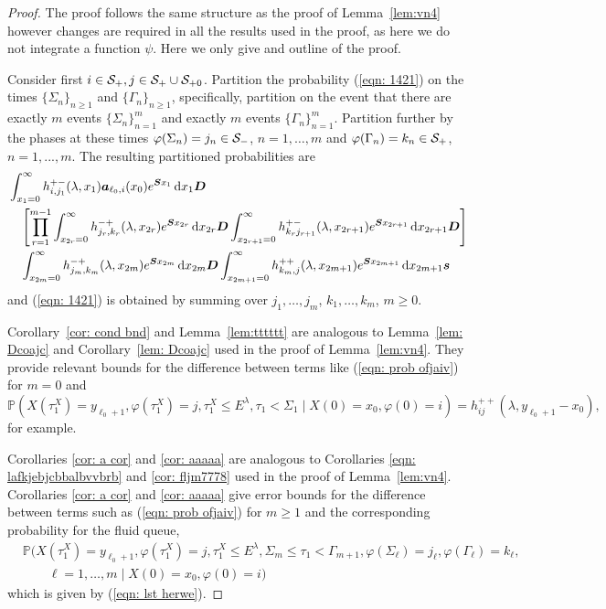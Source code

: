 \begin{proof}
	The proof follows the same structure as the proof of Lemma~\ref{lem:vn4} however changes are required in all the results used in the proof, as here we do not integrate a function \(\psi\). Here we only give and outline of the proof. 

	Consider first \(i\in \mathcal{S}_+,j\in\mathcal{S}_+\cup\mathcal{S}_{+0}\). Partition the probability (\ref{eqn: 1421}) on the times \(\{\Sigma_n\}_{n\geq 1}\) and \(\{\Gamma_n\}_{n\geq 1}\), specifically, partition on the event that there are exactly \(m\) events \(\{\Sigma_n\}_{n=1}^m\) and exactly \(m\) events \(\{\Gamma_n\}_{n=1}^m\). Partition further by the phases at these times \(\varphi(\Sigma_n)=j_n\in\mathcal{S}_-\), \(n=1,\dots,m\) and \(\varphi(\Gamma_n)=k_n\in\mathcal{S}_+\), \(n=1,...,m\). The resulting partitioned probabilities are
	\begin{align}
                 &\int_{x_1=0}^\infty h^{+-}_{i,j_{1}}(\lambda,x_1)\boldsymbol   a_{\ell_0,i}(x_0)e^{\boldsymbol{S}x_1}\, \mathrm{d} x_1 \boldsymbol{D}\nonumber
            	\\&\nonumber \quad \left[\prod_{r=1}^{m-1} \int_{x_{2r}=0}^\infty h^{-+}_{j_r,k_r}(\lambda,x_{2r}) e^{\boldsymbol{S}x_{2r}}\, \mathrm{d} x_{2r}\boldsymbol D \int_{x_{2r+1}=0}^\infty h^{+-}_{k_rj_{r+1}}(\lambda,x_{2r+1}) e^{\boldsymbol{S}x_{2r+1}} \, \mathrm{d} x_{2r+1}\boldsymbol D\right]
            	\\&
            	\quad \int_{x_{2m}=0}^\infty h^{-+}_{j_{m},k_m}(\lambda, x_{2m}) e^{\boldsymbol{S}x_{2m}} \, \mathrm{d} x_{2m} \boldsymbol{D}\int_{x_{2m+1}=0}^\infty h^{++}_{k_m,j}(\lambda,x_{2m+1}) e^{\boldsymbol{S}x_{2m+1}}\, \mathrm{d} x_{2m+1}\boldsymbol s  \label{eqn: prob ofjaiv}
	\end{align}
	and (\ref{eqn: 1421}) is obtained by summing over \(j_1,\dots,j_m\), \(k_1,\dots,k_m\), \(m\geq 0\). 
	
	Corollary~\ref{cor: cond bnd} and Lemma~\ref{lem:tttttt} are analogous to Lemma~\ref{lem: Dcoajc} and Corollary~\ref{lem: Dcoajc} used in the proof of Lemma~\ref{lem:vn4}. They provide relevant bounds for the difference between terms like (\ref{eqn: prob ofjaiv}) for \(m=0\) and 
	\[\mathbb P(X(\tau_1^X)=y_{\ell_0+1},\varphi(\tau_1^X)=j,\tau_1^X\leq E^\lambda, \tau_1<\Sigma_1 \mid X(0)=x_0, \varphi(0)=i) = h_{ij}^{++}(\lambda,y_{\ell_0+1}-x_0),\]
	for example.
	
	Corollaries \ref{cor: a cor} and \ref{cor: aaaaa} are analogous to Corollaries \ref{eqn: lafkjebjcbbalbvvbrb} and \ref{cor: fljm7778} used in the proof of Lemma~\ref{lem:vn4}. Corollaries \ref{cor: a cor} and \ref{cor: aaaaa} give error bounds for the difference between terms such as (\ref{eqn: prob ofjaiv}) for \(m\geq 1\) and the corresponding probability for the fluid queue, 
	\begin{align}
		&\mathbb P(X(\tau_1^X)=y_{\ell_0+1},\varphi(\tau_1^X)=j,\tau_1^X\leq E^\lambda, \Sigma_{m}\leq \tau_1<\Gamma_{m+1}, \varphi(\Sigma_\ell) = j_\ell, \varphi(\Gamma_\ell)=k_\ell, \nonumber
		\\&\qquad{} \ell = 1,\dots, m  \mid X(0)=x_0, \varphi(0)=i)
	\end{align}
	which is given by (\ref{eqn: lst herwe}). 
	

\end{proof}
